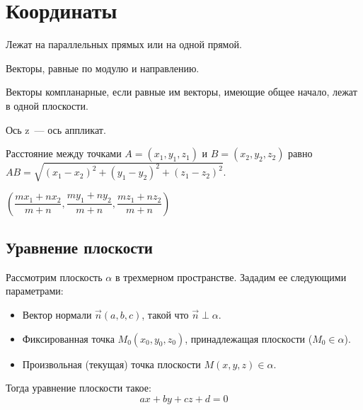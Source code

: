 \documentclass[12pt]{article}
\begin{document}
    \section{Координаты}

    \begin{definition}
        Лежат на параллельных прямых или на одной прямой.
    \end{definition}

    \begin{definition}
        Векторы, равные по модулю и направлению.
    \end{definition}

    \begin{definition}
        Векторы компланарные, если равные им векторы, имеющие общее начало, лежат в одной плоскости.
    \end{definition}

    \begin{note}
        Ось z~--- ось аппликат.
    \end{note}

    \begin{definition}[Расстояние]
        Расстояние между точками $A = (x_1, y_1, z_1)$ и $B = (x_2, y_2, z_2)$ равно $AB = \sqrt{(x_1 - x_2)^2 + (y_1 - y_2)^2 + (z_1 - z_2)^2}$.
    \end{definition}

    \begin{statement}
        $\left( \dfrac{m x_1 + n x_2}{m + n}, \dfrac{m y_1 + n y_2}{m + n}, \dfrac{m z_1 + n z_2}{m + n} \right)$
    \end{statement}
    
    \subsection{Уравнение плоскости}
	
	\begin{statement}
        Рассмотрим плоскость $\alpha$ в трехмерном пространстве. Зададим ее следующими параметрами:
        \begin{itemize}
            \item Вектор нормали $\vec{n}(a, b, c)$, такой что $\vec{n} \perp \alpha$.
            \item Фиксированная точка $M_0(x_0, y_0, z_0)$, принадлежащая плоскости ($M_0 \in \alpha$).
            \item Произвольная (текущая) точка плоскости $M(x, y, z) \in \alpha$.
        \end{itemize}
        Тогда уравнение плоскости такое:
        \[
        ax + by + cz + d = 0
        \]
    \end{statement}
    
\end{document}
